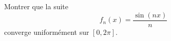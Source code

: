 

\begin{exercice}\label{exo115}

Montrer que la suite 
\begin{equation}
	f_n(x)=\frac{ \sin(nx) }{ n }
\end{equation}
converge uniformément sur $[0,2\pi]$.

\end{exercice}
